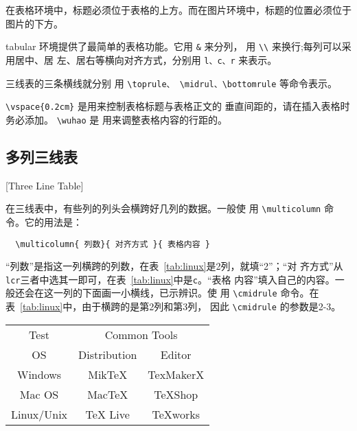 在表格环境中，标题必须位于表格的上方。而在图片环境中，标题的位置必须位于
图片的下方。

tabular 环境提供了最简单的表格功能。它用 \texttt{\&} 来分列，
用 \texttt{\textbackslash{\textbackslash{}}} 来换行;每列可以采用居中、居
左、居右等横向对齐方式，分别用 \texttt{l、c、r} 来表示。

三线表的三条横线就分别
用 \verb|\toprule、 \midrul、\bottomrule| 等命令表示。

\verb|\vspace{0.2cm}| 是用来控制表格标题与表格正文的
垂直间距的，请在插入表格时务必添加。 \verb|\wuhao| 是
用来调整表格内容的行距的。


\subsection{多列三线表}[Three Line Table]

在三线表中，有些列的列头会横跨好几列的数据。一般使
用 \verb|\multicolumn| 命令。它的用法是：
\begin{lstlisting}
  \multicolumn{ 列数}{ 对齐方式 }{ 表格内容 }
\end{lstlisting}

“列数”是指这一列横跨的列数，在表~\ref{tab:linux}是2列，就填“2”；“对
齐方式”从\texttt{lcr}三者中选其一即可，在表~\ref{tab:linux}中是\texttt{c}。“表格
内容”填入自己的内容。一般还会在这一列的下面画一小横线，已示辨识。使
用 \verb|\cmidrule| 命令。在表~\ref{tab:linux}中，由于横跨的是第2列和第3列，
因此 \verb|\cmidrule| 的参数是2-3。

\begin{table}[htbp]
  \centering
  \vspace{0.2cm}
  \wuhao
  \begin{tabular}{ccc}
    \toprule
    Test       & \multicolumn{2}{c}{Common Tools}             \\
    \cmidrule{2-3}
    OS         & Distribution                     & Editor    \\
    \midrule
    Windows    & MikTeX                           & TexMakerX \\
    Mac OS     & MacTeX                           & TeXShop   \\
    Linux/Unix & TeX Live                         & TeXworks  \\
    \bottomrule
  \end{tabular}
\end{table}


